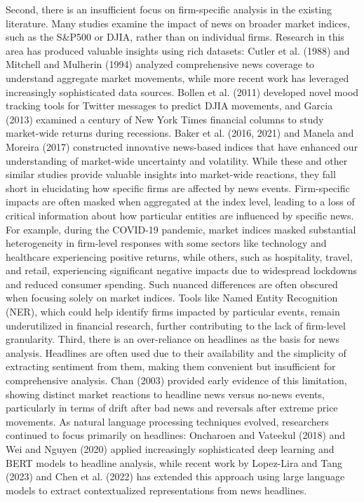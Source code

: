 Second, there is an insufficient focus on firm-specific analysis in the existing literature. Many studies examine the impact of news on broader market indices, such as the S\&P500 or DJIA, rather than on individual firms. Research in this area has produced valuable insights using rich datasets: Cutler et al. (1988) and Mitchell and Mulherin (1994) analyzed comprehensive news coverage to understand aggregate market movements, while more recent work has leveraged increasingly sophisticated data sources. Bollen et al. (2011) developed novel mood tracking tools for Twitter messages to predict DJIA movements, and Garcia (2013) examined a century of New York Times financial columns to study market-wide returns during recessions. Baker et al. (2016, 2021) and Manela and Moreira (2017) constructed innovative news-based indices that have enhanced our understanding of market-wide uncertainty and volatility.
While these and other similar studies provide valuable insights into market-wide reactions, they fall short in elucidating how specific firms are affected by news events. Firm-specific impacts are often masked when aggregated at the index level, leading to a loss of critical information about how particular entities are influenced by specific news. 
For example, during the COVID-19 pandemic, market indices masked substantial heterogeneity in firm-level responses
 with some sectors like technology and healthcare experiencing positive returns, while others, such as hospitality, travel, and retail, experiencing significant negative impacts due to widespread lockdowns and reduced consumer spending. 
Such nuanced differences are often obscured when focusing solely on market indices. Tools like Named Entity Recognition (NER), which could help identify firms impacted by particular events, remain underutilized in financial research, further contributing to the lack of firm-level granularity.
Third, there is an over-reliance on headlines as the basis for news analysis. Headlines are often used due to their availability and the simplicity of extracting sentiment from them, making them convenient but insufficient for comprehensive analysis. Chan (2003) provided early evidence of this limitation, showing distinct market reactions to headline news versus no-news events, particularly in terms of drift after bad news and reversals after extreme price movements. As natural language processing techniques evolved, researchers continued to focus primarily on headlines: Oncharoen and Vateekul (2018) and Wei and Nguyen (2020) applied increasingly sophisticated deep learning and BERT models to headline analysis, while recent work by Lopez-Lira and Tang (2023) and Chen et al. (2022) has extended this approach using large language models to extract contextualized representations from news headlines.

